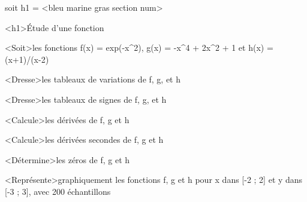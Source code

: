 \documentclass[marges=20, taille=11, precision=3]{texecole}
\begin{document}
soit h1 = <bleu marine gras section num>

<h1>Étude d'une fonction

<Soit>les fonctions f(x) = exp(-x^2), g(x) = -x^4 + 2x^2 + 1 et h(x) = (x+1)/(x-2)

<Dresse>les tableaux de variations de f, g, et h

<Dresse>les tableaux de signes de f, g, et h

<Calcule>les dérivées de f, g et h

<Calcule>les dérivées secondes de f, g et h

<Détermine>les zéros de f, g et h

<Représente>graphiquement les fonctions f, g et h pour x dans [-2 ; 2] et y dans [-3 ; 3], avec 200 échantillons
\end{document}
